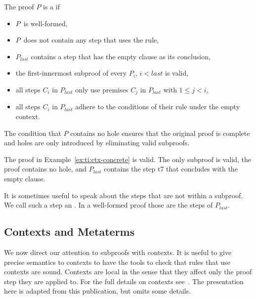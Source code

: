 \documentclass{scrartcl}
\begin{document}
\begin{definition}
  The proof $P$ is a  if
  \begin{itemize}
    \item $P$\, is well-formed,
    \item $P$\, does not contain any step that uses the  rule,
    \item $P_{\mathit{last}}$ contains a step that has the empty clause as its conclusion,
    \item the first-innermost subproof of every $P_i$, $i < \mathit{last}$ is valid,
    \item all steps $C_i$ in $P_{\mathit{last}}$ only use premises
          $C_j$ in $P_{\mathit{last}}$ with $1 \leq j < i$,
    \item all steps $C_i$ in $P_{\mathit{last}}$ adhere to the conditions of their
    rule under the empty context.
  \end{itemize}
\end{definition}

The condition that $P$ contains no hole ensures that the original
proof is complete and holes are only introduced by eliminating valid
subproofs.

\begin{example}
The proof in Example~\ref{ex:ti:ctx-concrete} is valid.  The only
subproof is valid, the proof contains no hole, and $P_{\mathit{last}}$
contains the step \textsf{\color{SmtStepId} t7} that concludes with the empty clause.
\end{example}

It is sometimes useful to speak about the steps that are not within a
subproof.  We call such a step an .  In a well-formed proof those are the steps
of $P_{\mathit{last}}$.

\subsection{Contexts and Metaterms}

We now direct our attention to subproofs with contexts.
It is useful to give precise semantics
to contexts to have the tools to check that rules that use contexts
are sound.
Contexts are local in the sense that they affect only the
proof step they are applied to.
For the full details on contexts see~\cite{barbosa-2019}.
The presentation here is adapted from this publication, but omits some
details.
\end{document}

